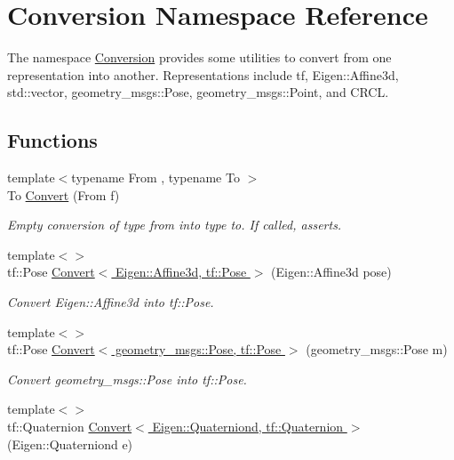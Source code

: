 \hypertarget{namespaceConversion}{\section{Conversion Namespace Reference}
\label{namespaceConversion}
}


The namespace \hyperlink{namespaceConversion}{Conversion} provides some utilities to convert from one representation into another. Representations include tf, Eigen\-::\-Affine3d, std\-::vector, geometry\-\_\-msgs\-::\-Pose, geometry\-\_\-msgs\-::\-Point, and C\-R\-C\-L.  


\subsection*{Functions}
\begin{DoxyCompactItemize}
\item 
{\footnotesize template$<$typename From , typename To $>$ }\\To \hyperlink{namespaceConversion_ac7f0bd2e3357937bb18ca06a40276712}{Convert} (From f)
\begin{DoxyCompactList}\small\item\em Empty conversion of type from into type to. If called, asserts. \end{DoxyCompactList}\item 
{\footnotesize template$<$$>$ }\\tf\-::\-Pose \hyperlink{namespaceConversion_abcf96a9bf13217fe7840a99ec0fa491a}{Convert$<$ Eigen\-::\-Affine3d, tf\-::\-Pose $>$} (Eigen\-::\-Affine3d pose)
\begin{DoxyCompactList}\small\item\em Convert Eigen\-::\-Affine3d into tf\-::\-Pose. \end{DoxyCompactList}\item 
{\footnotesize template$<$$>$ }\\tf\-::\-Pose \hyperlink{namespaceConversion_a7733ae1aea664b09b41186766db5812f}{Convert$<$ geometry\-\_\-msgs\-::\-Pose, tf\-::\-Pose $>$} (geometry\-\_\-msgs\-::\-Pose m)
\begin{DoxyCompactList}\small\item\em Convert geometry\-\_\-msgs\-::\-Pose into tf\-::\-Pose. \end{DoxyCompactList}\item 
{\footnotesize template$<$$>$ }\\tf\-::\-Quaternion \hyperlink{namespaceConversion_ad4572622bac92a39114266c05ed4e034}{Convert$<$ Eigen\-::\-Quaterniond, tf\-::\-Quaternion $>$} (Eigen\-::\-Quaterniond e)

\end{DoxyCompactItemize}
